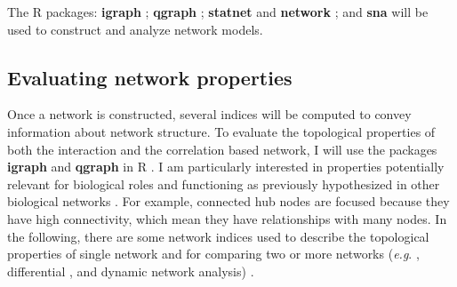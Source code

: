 The \textsf{R} packages: \textbf{igraph} \citep{Csardi:2010wx}; \textbf{qgraph} \citep{qgraph}; \textbf{statnet} \citep{statnetpackage} and \textbf{network} \citep{networkpackage}; and \textbf{sna} \citep{snapackage} will be used to construct and analyze network models.


\subsection*{Evaluating network properties}

Once a network is constructed, several indices will be computed to convey information about network structure. To evaluate the topological properties of both the interaction and the correlation based network, I will use the packages \textbf{igraph} and \textbf{qgraph} in \textsf{R} \citep{qgraph}. I am particularly interested in properties potentially relevant for biological roles and functioning as previously hypothesized in other biological networks \citep{Strogatz:2001wc, horvath2011weighted}. For example, connected hub nodes are focused because they have high connectivity, which mean they have relationships with many nodes. In the following, there are some network indices used to describe the topological properties of single network and for comparing two or more networks (\textit{e.g}. , differential , and dynamic network analysis) 
.


